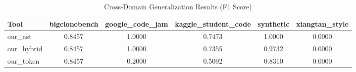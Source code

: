 \begin{table}[h]
\centering
\caption{Cross-Domain Generalization Results (F1 Score)}
\label{tab:cross-domain}
\begin{tabular}{lccccc}
\toprule
Tool & bigclonebench & google_code_jam & kaggle_student_code & synthetic & xiangtan_style \\
\midrule
our_ast & 0.8457 & 1.0000 & 0.7473 & 1.0000 & 0.0000 \\
our_hybrid & 0.8457 & 1.0000 & 0.7355 & 0.9732 & 0.0000 \\
our_token & 0.8457 & 0.2000 & 0.5092 & 0.8310 & 0.0000 \\
\bottomrule
\end{tabular}
\end{table}